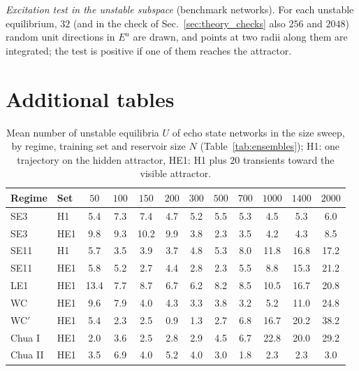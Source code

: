 \documentclass[aip,cha,reprint,amsmath,amssymb,longbibliography]{revtex4-2}
\theoremstyle{definition}
\begin{document}
\emph{Excitation test in the unstable subspace} (benchmark networks). For each unstable equilibrium, $32$ (and in the
check of Sec.~\ref{sec:theory_checks} also $256$ and $2048$) random unit directions in $E^u$ are drawn, and points at two
radii along them are integrated; the test is positive if one of them reaches the attractor.

\section{Additional tables}
\label{app:tables}

\begin{table}
\caption{Mean number of unstable equilibria $U$ of echo state networks in the size sweep, by regime, training set and
reservoir size $N$ (Table~\ref{tab:ensembles}); H1: one trajectory on the hidden attractor, HE1: H1 plus $20$ transients toward the visible attractor.}
\label{tab:UN}
\begin{ruledtabular}
\begin{tabular}{llcccccccccc}
Regime & Set & $50$ & $100$ & $150$ & $200$ & $300$ & $500$ & $700$ & $1000$ & $1400$ & $2000$ \\
\hline
SE3 & H1 & 5.4 & 7.3 & 7.4 & 4.7 & 5.2 & 5.5 & 5.3 & 4.5 & 5.3 & 6.0 \\
SE3 & HE1 & 9.8 & 9.3 & 10.2 & 9.9 & 3.8 & 2.3 & 3.5 & 4.2 & 4.3 & 8.5 \\
SE11 & H1 & 5.7 & 3.5 & 3.9 & 3.7 & 4.8 & 5.3 & 8.0 & 11.8 & 16.8 & 17.2 \\
SE11 & HE1 & 5.8 & 5.2 & 2.7 & 4.4 & 2.8 & 2.3 & 5.5 & 8.8 & 15.3 & 21.2 \\
LE1 & HE1 & 13.4 & 7.7 & 8.7 & 6.7 & 6.2 & 8.2 & 8.5 & 10.5 & 16.7 & 20.8 \\
WC & HE1 & 9.6 & 7.9 & 4.0 & 4.3 & 3.3 & 3.8 & 3.2 & 5.2 & 11.0 & 24.8 \\
WC$'$ & HE1 & 5.4 & 2.3 & 2.5 & 0.9 & 1.3 & 2.7 & 6.8 & 16.7 & 20.2 & 38.2 \\
Chua I & HE1 & 2.0 & 3.6 & 2.5 & 2.8 & 2.9 & 4.5 & 6.7 & 22.8 & 20.0 & 29.2 \\
Chua II & HE1 & 3.5 & 6.9 & 4.0 & 5.2 & 4.0 & 3.0 & 1.8 & 2.3 & 2.3 & 3.0 \\
\end{tabular}
\end{ruledtabular}
\end{table}
\end{document}
